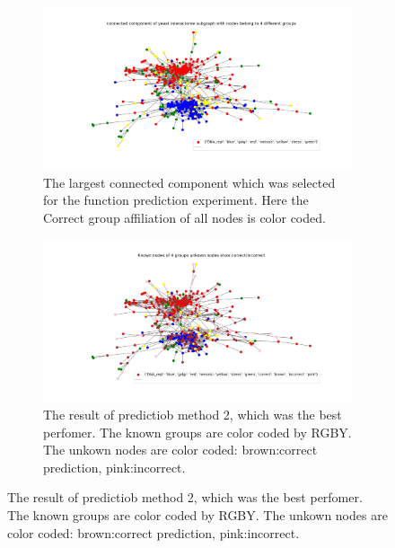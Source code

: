 \begin{figure}
\begin{framed}
\centering
\begin{subfigure}[b]{\textwidth}
\includegraphics[width=\textwidth]{figures/connected component of yeast interactome subgraph with nodes belong to 4 different groups.png}
\caption{The largest connected component which was selected for the function
prediction experiment. Here the Correct group affiliation of all nodes is color
coded.}
\label{fig:largest_connected_comp}
\end{subfigure}
\begin{subfigure}[b]{\textwidth}
\includegraphics[width=\textwidth]{figures/method2_true_false_clustering_on_4_groups_with_ordering_and_update.png}
\caption{The result of predictiob method 2, which was the best perfomer. 
The known groups are color coded by RGBY. The unkown nodes are color
coded: brown:correct prediction, pink:incorrect.}
\label{fig:my_prediction}
\end{subfigure}
\end{framed}
\end{figure}

